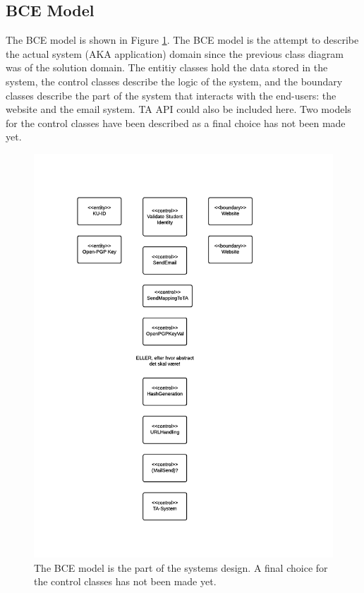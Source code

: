 \documentclass[11pt,a4paper]{report}
\begin{document}
\subsection*{BCE Model}
The BCE model is shown in Figure \ref{fig:bce_model}. The BCE model is the  attempt to describe the actual system (AKA application) domain since the previous class diagram was of the solution domain. The entitiy classes hold the data stored in the system, the control classes describe the logic of the system, and the boundary classes describe the part of the system that interacts with the end-users: the website and the email system. TA API could also be included here. Two models for the control classes have been described as a final choice has not been made yet.
\begin{figure}[H]
    \centering
    \includegraphics[width=\textwidth]{pictures/bce_genaflevering}
    \caption{The BCE model is the  part of the systems design. A final choice for the control classes has not been made yet.}
    \label{fig:bce_model}
\end{figure}
\end{document}

